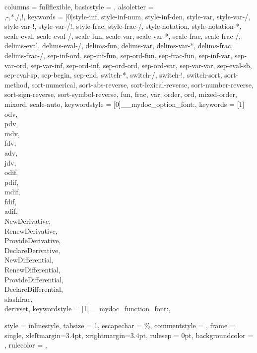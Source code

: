 {
	columns = fullflexible,
	basicstyle = \ttfamily\upshape\small,
	alsoletter =  {\\,-,*,/,!},
	keywords = [0]{style-inf, style-inf-num, style-inf-den, style-var, style-var-/, style-var-!, style-var-/!, style-frac, style-frac-/, style-notation, style-notation-*, scale-eval, scale-eval-/, scale-fun, scale-var, scale-var-*, scale-frac, scale-frac-/, delims-eval, delims-eval-/, delims-fun, delims-var, delims-var-*, delims-frac, delims-frac-/, sep-inf-ord, sep-inf-fun, sep-ord-fun, sep-frac-fun, sep-inf-var, sep-var-ord, sep-var-inf, sep-ord-inf, sep-ord-ord, sep-ord-var, sep-var-var, sep-eval-sb, sep-eval-sp, sep-begin, sep-end, switch-*, switch-/, switch-!, switch-sort, sort-method, sort-numerical, sort-abs-reverse, sort-lexical-reverse, sort-number-reverse, sort-sign-reverse, sort-symbol-reverse, fun, frac, var, order, ord, mixed-order, mixord, scale-auto},
	keywordstyle = [0]\__mydoc_option_font:,
	keywords = [1]{\\odv, \\pdv, \\mdv, \\fdv, \\adv, \\jdv, \\odif, \\pdif, \\mdif, \\fdif, \\adif, \\NewDerivative, \\RenewDerivative, \\ProvideDerivative, \\DeclareDerivative, \\NewDifferential, \\RenewDifferential, \\ProvideDifferential, \\DeclareDifferential, \\slashfrac, \\derivset},
	keywordstyle = [1]\__mydoc_function_font:,
}

{
	style = inlinestyle,
	tabsize = 1,
	escapechar = \%,
	commentstyle = \footnotesize,
	frame = single,
	xleftmargin=3.4pt,
	xrightmargin=3.4pt,
	rulesep = 0pt,
	backgroundcolor = \color{RoyalLightGray},
	rulecolor = \color{RoyalGray},
}


